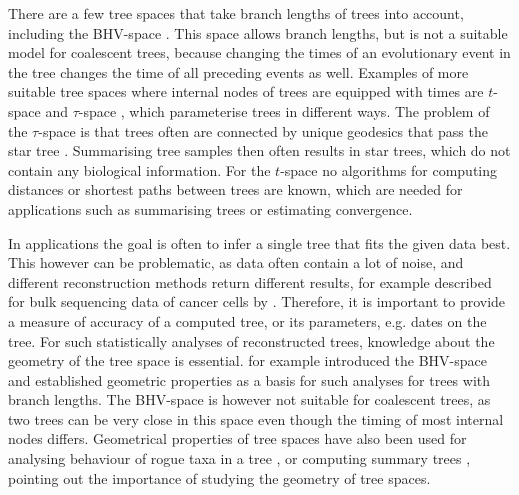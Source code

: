 \documentclass[11pt]{amsart}
\newcommand{\rnni}{\mathrm{RNNI}}
\newcommand{\dtt}{\mathrm{DCT}}
\newcommand{\summary}[1]{} %
\begin{document}
\summary{Known tree spaces -- BHV, $t$-space and $\tau$-space}
There are a few tree spaces that take branch lengths of trees into account, including the BHV-space \autocite{Billera2001-rj}.
This space allows branch lengths, but is not a suitable model for coalescent trees, because changing the times of an evolutionary event in the tree changes the time of all preceding events as well.
Examples of more suitable tree spaces where internal nodes of trees are equipped with times are $t$-space and $\tau$-space \autocite{Gavryushkin2016-uu}, which parameterise trees in different ways.
The problem of the $\tau$-space is that trees often are connected by unique geodesics that pass the star tree \autocite{Gavryushkin2016-uu}.
Summarising tree samples then often results in star trees, which do not contain any biological information.
For the $t$-space no algorithms for computing distances or shortest paths between trees are known, which are needed for applications such as summarising trees or estimating convergence.

\summary{Why we want to investigate geometrical properties of $\dtt_m$ and $\rnni$}
In applications the goal is often to infer a single tree that fits the given data best.
This however can be problematic, as data often contain a lot of noise, and different reconstruction methods return different results, for example described for bulk sequencing data of cancer cells by \autocite{Miura2020-im}.
Therefore, it is important to provide a measure of accuracy of a computed tree, or its parameters, e.g. dates on the tree.
For such statistically analyses of reconstructed trees, knowledge about the geometry of the tree space is essential.
\textcite{Billera2001-rj} for example introduced the BHV-space and established geometric properties as a basis for such analyses for trees with branch lengths.
The BHV-space is however not suitable for coalescent trees, as two trees can be very close in this space even though the timing of most internal nodes differs.
Geometrical properties of tree spaces have also been used for analysing behaviour of rogue taxa in a tree \autocite{Cueto2011-bh}, or computing summary trees \autocite{Miller2015-rk}, pointing out the importance of studying the geometry of tree spaces.
\end{document}
